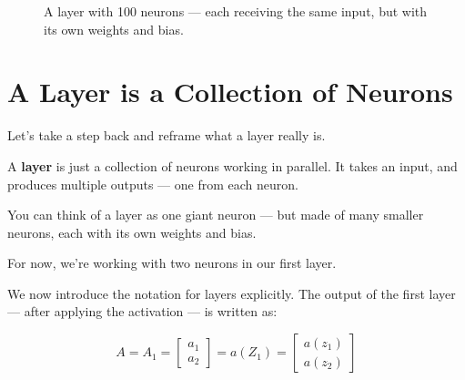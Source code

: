 \documentclass[11pt]{article}
\begin{document}
\begin{figure}[H]
\centering
{}
\caption{A layer with 100 neurons — each receiving the same input, but with its own weights and bias.}
\end{figure}
\section{A Layer is a Collection of Neurons}

Let’s take a step back and reframe what a layer really is.

A \textbf{layer} is just a collection of neurons working in parallel.  
It takes an input, and produces multiple outputs — one from each neuron.  

\begin{insightbox}[title=Analogy]
You can think of a layer as one giant neuron —  
but made of many smaller neurons, each with its own weights and bias.
\end{insightbox}

For now, we’re working with two neurons in our first layer.

We now introduce the notation for layers explicitly.  
The output of the first layer — after applying the activation — is written as:

\[
A = A_1 = 
\begin{bmatrix}
a_1 \\
a_2
\end{bmatrix}
= a(Z_1) =
\begin{bmatrix}
a(z_1) \\
a(z_2)
\end{bmatrix}
\]
\end{document}
